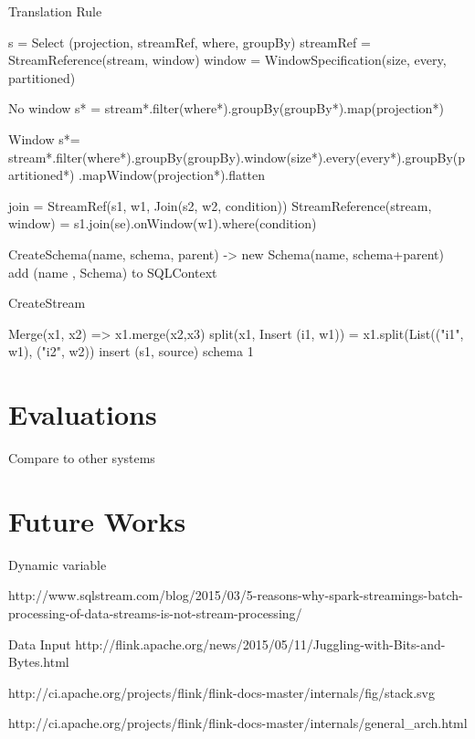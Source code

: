 Translation Rule

 s = Select (projection, streamRef, where, groupBy)
streamRef = StreamReference(stream, window)
window = WindowSpecification(size, every, partitioned)




No window
s* = stream*.filter(where*).groupBy(groupBy*).map(projection*)

Window
s*= stream*.filter(where*).groupBy(groupBy).window(size*).every(every*).groupBy(partitioned*)
.mapWindow(projection*).flatten


join = StreamRef(s1, w1, Join(s2, w2, condition))
StreamReference(stream, window) = s1.join(se).onWindow(w1).where(condition)


CreateSchema(name, schema, parent)
-> new Schema(name, schema+parent)
	add (name , Schema) to SQLContext

CreateStream 

Merge(x1, x2) => x1.merge(x2,x3)
split(x1, Insert (i1, w1))  = x1.split(List(("i1", w1), ("i2", w2))
insert (s1, source) schema 1 




\section{Evaluations}

Compare to other systems


\section{Future Works}

Dynamic variable


http://www.sqlstream.com/blog/2015/03/5-reasons-why-spark-streamings-batch-processing-of-data-streams-is-not-stream-processing/



Data Input
http://flink.apache.org/news/2015/05/11/Juggling-with-Bits-and-Bytes.html


http://ci.apache.org/projects/flink/flink-docs-master/internals/fig/stack.svg

http://ci.apache.org/projects/flink/flink-docs-master/internals/general\_arch.html